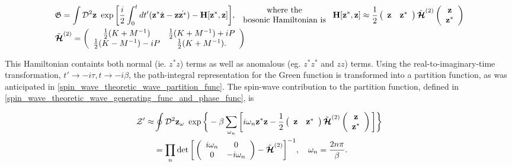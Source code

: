 \begin{equation}
\begin{split}
    &\mathfrak{G} = \int \mathcal{D}^2 {\bf z} \textnormal{ } \exp \bigg[\frac{i}{2} \int_{0}^{t} dt'({\bf z}^{*}\dot{{\bf z}} - {\bf z}\dot{{\bf z}^{*}}) - {\bf H}[{\bf z}^{*}, {\bf z}] \bigg], \begin{array}{cc}
         \textnormal{ where the }  \\
         \textnormal{ bosonic Hamiltonian is } 
    \end{array} {\bf H}[{\bf z}^{*}, {\bf z}] \approx \frac{1}{2} \left(\begin{array}{cc}
          {\bf z} & {\bf z}^{*}
    \end{array}\right) \tilde{\bm{\mathcal{H}}}^{(2)} \left( \begin{array}{c}
          {\bf z} \\
          {\bf z}^{*}
    \end{array}\right) \\
    & \tilde{\bm{\mathcal{H}}}^{(2)} = \left(\begin{array}{cc}
         \frac{1}{2} (K+M^{-1}) & \frac{1}{2} (K+M^{-1}) + iP  \\
         \frac{1}{2} (K-M^{-1}) -iP & \frac{1}{2} (K+M^{-1}).
    \end{array}\right)
\end{split}
\label{spin_wave_path_int_bosonic_cohr_rep}
\end{equation}

This Hamiltonian containts both normal (ie. $z^* z$) terms as well as anomalous (eg. $z^* z^*$ and $zz$) terms. Using the real-to-imaginary-time transformation, $t' \rightarrow -i\tau, t \rightarrow -i\beta$, the path-integral representation for the Green function is transformed into a partition function, as was anticipated in \cref{spin_wave_theoretic_wave_partition_func}. The spin-wave contribution to the partition function, defined in \cref{spin_wave_theoretic_wave_generating_func_and_phase_func}, is 

\begin{equation}
\begin{split}
    \mathcal{Z}' \approx& \oint \mathcal{D}^2 {\bf z}_\omega \textnormal{ } \exp \bigg\{-\beta \sum_{\omega_n} \bigg[i \omega_n {\bf z}^* {\bf z} - \frac{1}{2} \left(\begin{array}{cc}
          {\bf z} & {\bf z}^{*}
    \end{array}\right) \tilde{\bm{\mathcal{H}}}^{(2)} \left( \begin{array}{c}
          {\bf z} \\
          {\bf z}^{*}
    \end{array}\right) \bigg]\bigg\} \\
    &= \prod_n \det \bigg[\left(\begin{array}{cc}
        i \omega_n & 0  \\
        0 & -i\omega_n
    \end{array}\right) - \tilde{\bm{\mathcal{H}}}^{(2)} \bigg]^{-1}, \quad \omega_n = \frac{2n\pi}{\beta}. 
\end{split}
\label{spin_wave_path_int_partition_function}
\end{equation}

